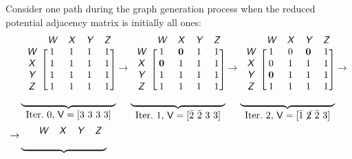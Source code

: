 \noindent Consider one path during the graph generation process when the  reduced potential adjacency matrix is initially all ones:
\begin{align*}
\begin{aligned}
& \underbrace{
\begin{blockarray}{ccccc}
& \xcolor{W} & \xcolor{X} & \xcolor{Y} & \xcolor{Z} \\
\begin{block}{c[cccc]}
\xcolor{W} & 1 & 1 & 1 & 1 \\
\xcolor{X} & 1 & 1 & 1 & 1 \\
\xcolor{Y} & 1 & 1 & 1 & 1 \\
\xcolor{Z} & 1 & 1 & 1 & 1 \\
\end{block}
\end{blockarray}
}_{\textstyle \text{Iter.~0, }\xvar{V} = [3\ 3\ 3\ 3] }
\rightarrow
\underbrace{
\begin{blockarray}{ccccc}
& \xcolor{W} & \xcolor{X} & \xcolor{Y} & \xcolor{Z} \\
\begin{block}{c[cccc]}
\xcolor{W} & 1 & \bm{0} & 1 & 1 \\
\xcolor{X} & \bm{0} & 1 & 1 & 1 \\
\xcolor{Y} & 1 & 1 & 1 & 1 \\
\xcolor{Z} & 1 & 1 & 1 & 1 \\
\end{block}
\end{blockarray}
}_{\textstyle \text{Iter.~1, }\xvar{V} = [\bar{2}\ \bar{\ghilght{2}}\ \ghilght{3}\ \ghilght{3}] }
\rightarrow
\underbrace{
\begin{blockarray}{ccccc}
& \xcolor{W} & \xcolor{X} & \xcolor{Y} & \xcolor{Z} \\
\begin{block}{c[cccc]}
\xcolor{W} & 1 & 0 & \bm{0} & 1 \\
\xcolor{X} & 0 & 1 & 1 & 1 \\
\xcolor{Y} & \bm{0} & 1 & 1 & 1 \\
\xcolor{Z} & 1 & 1 & 1 & 1 \\
\end{block}
\end{blockarray}
}_{\textstyle \text{Iter.~2, }\xvar{V} = [\bar{1}\ \rhilght{2}\ \bar{\ghilght{2}}\ \ghilght{3}] }
\rightarrow
\\
%
\rightarrow
& \underbrace{
\begin{blockarray}{ccccc}
& \xcolor{W} & \xcolor{X} & \xcolor{Y} & \xcolor{Z} \\

\end{blockarray}}
\end{aligned}
\end{align*}
